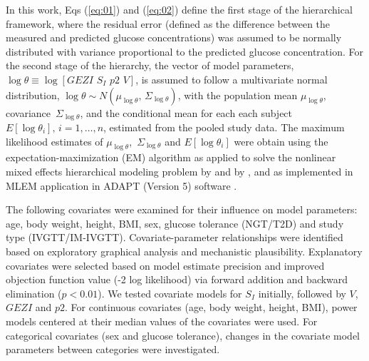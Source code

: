 \documentclass[utf8]{frontiersSCNS} %
\begin{document}
In this work, Eqs (\ref{eq:01}) and (\ref{eq:02}) define the first stage of the hierarchical framework, where the residual error (defined as the difference between the measured and predicted glucose concentrations) was assumed to be normally distributed with variance proportional to the predicted glucose concentration. For the second stage of the hierarchy, the vector of model parameters, $\log \theta  \equiv \log \left[ {GEZI\,\,{S_I}\,\,p2\,\,V} \right]$, is assumed to follow a multivariate normal distribution, $\log \theta  \sim N\left( {{\mu_{\log \theta }},\,{\Sigma _{\log \theta }}} \right)$, with the population mean   ${\mu _{\log \theta }}$, covariance $\,{\Sigma _{\log \theta }}$, and the conditional mean for each each subject $E\left[ {\log {\theta _i}} \right],\,i = 1, \ldots ,n$, estimated from the pooled study data. The maximum likelihood estimates of   ${\mu _{\log \theta }}$, $\,{\Sigma _{\log \theta }}$ and $E\left[ {\log {\theta _i}} \right]$ were obtain using the expectation-maximization (EM) algorithm as applied to solve the nonlinear mixed effects hierarchical modeling problem by \citet{Schumitzky1995EMAnalysis} and  by \citet{walker_1996}, and as implemented in  MLEM application in ADAPT (Version 5) software \citep{AdaptUserGuide}. 

The following covariates were examined for their influence on  model parameters: age, body weight, height, BMI, sex, glucose tolerance (NGT/T2D) and study type (IVGTT/IM-IVGTT). Covariate-parameter relationships were identified based on exploratory graphical analysis and mechanistic plausibility. Explanatory covariates were selected based on model estimate precision and improved objection function value (-2 log likelihood) via forward addition and backward elimination ($p<0.01$). We tested covariate models for $S_I$ initially, followed by $V$, $GEZI$ and $p2$. For continuous covariates (age, body weight, height, BMI), power models centered at their median values of the covariates were used. For categorical covariates (sex and glucose tolerance), changes in the covariate model parameters between categories were investigated. 

\vskip 0.5cm
\end{document}
